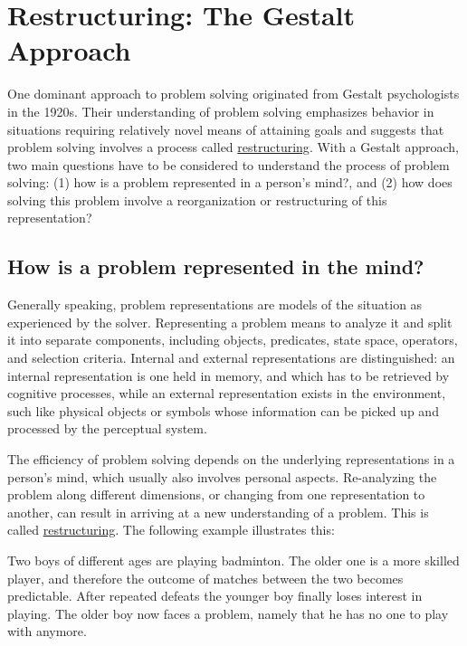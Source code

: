 \documentclass[
]{krantz}
\begin{document}
\hypertarget{restructuring-the-gestalt-approach}{%
\section{Restructuring: The Gestalt Approach}\label{restructuring-the-gestalt-approach}}

One dominant approach to problem solving originated from Gestalt psychologists in the 1920s. Their understanding of problem solving emphasizes behavior in situations requiring relatively novel means of attaining goals and suggests that problem solving involves a process called \protect\hyperlink{restructuring}{restructuring}. With a Gestalt approach, two main questions have to be considered to understand the process of problem solving: (1) how is a problem represented in a person's mind?, and (2) how does solving this problem involve a reorganization or restructuring of this representation?

\hypertarget{how-is-a-problem-represented-in-the-mind}{%
\subsection*{How is a problem represented in the mind?}\label{how-is-a-problem-represented-in-the-mind}}


Generally speaking, problem representations are models of the situation as experienced by the solver. Representing a problem means to analyze it and split it into separate components, including objects, predicates, state space, operators, and selection criteria. Internal and external representations are distinguished: an internal representation is one held in memory, and which has to be retrieved by cognitive processes, while an external representation exists in the environment, such like physical objects or symbols whose information can be picked up and processed by the perceptual system.

The efficiency of problem solving depends on the underlying representations in a person's mind, which usually also involves personal aspects. Re-analyzing the problem along different dimensions, or changing from one representation to another, can result in arriving at a new understanding of a problem. This is called \protect\hyperlink{restructuring}{restructuring}. The following example illustrates this:

Two boys of different ages are playing badminton. The older one is a more skilled player, and therefore the outcome of matches between the two becomes predictable. After repeated defeats the younger boy finally loses interest in playing. The older boy now faces a problem, namely that he has no one to play with anymore.
\end{document}

